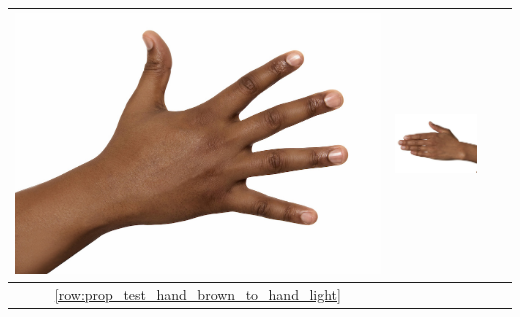 \begin{longtable}{|c||c|c|c|}
\begin{minipage}{.29\textwidth}
    \includegraphics[width=\textwidth,height=\textheight,keepaspectratio]{../inputs/hand_dark.jpg}
  \end{minipage} & 
  \begin{minipage}{.29\textwidth}
    \includegraphics[width=\textwidth,height=\textheight,keepaspectratio]{../rc_test/outputs/20170516_proportional_test/hand_brown_to_hand_dark.jpg}
  \end{minipage} \\
\hline  \ref{row:prop_test_hand_brown_to_hand_light} &
  \begin{minipage}{.29\textwidth}

\end{minipage}
\end{longtable}
